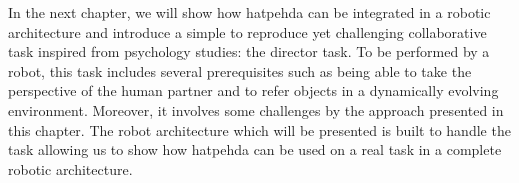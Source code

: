 \documentclass[a4paper,11pt,twoside]{StyleThese}
\begin{document}
In the next chapter, we will show how \acrshort{hatpehda} can be integrated in a robotic architecture and introduce a simple to reproduce yet challenging collaborative task inspired from psychology studies: the director task. To be performed by a robot, this task includes several prerequisites such as being able to take the perspective of the human partner and to refer objects in a dynamically evolving environment. Moreover, it involves some challenges by the approach presented in this chapter. The robot architecture which will be presented is built to handle the task allowing us to show how \acrshort{hatpehda} can be used on a real task in a complete robotic architecture.

\ifdefined{}
\else


\end{document}
